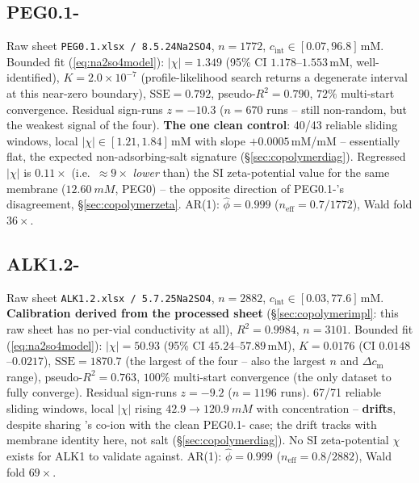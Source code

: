 \documentclass[11pt]{article}
\newcommand{\cint}{c_{\mathrm{int}}}
\newcommand{\SSE}{\mathrm{SSE}}
\begin{document}
\subsection{PEG0.1-}\label{sec:app-copolymer-peg01na2so4}
Raw sheet \texttt{PEG0.1.xlsx / 8.5.24Na2SO4}, $n=1772$,
$\cint\in[0.07,96.8]$\,mM. Bounded fit (\eqref{eq:na2so4model}):
$|\chi|=1.349$ (95\% CI $1.178$--$1.553$\,mM, well-identified), $K=2.0\times10^{-7}$
(profile-likelihood search returns a degenerate interval at this near-zero
boundary), $\SSE=0.792$, pseudo-$R^2=0.790$, $72\%$ multi-start convergence.
Residual sign-runs $z=-10.3$ ($n=670$ runs -- still non-random, but the
weakest signal of the four). \textbf{The one clean control}: 40/43 reliable
sliding windows, local $|\chi|\in[1.21,1.84]$\,mM with slope $+0.0005$\,mM/mM
-- essentially flat, the expected non-adsorbing-salt signature
(\S\ref{sec:copolymerdiag}). Regressed $|\chi|$ is $0.11\times$ (i.e.\
$\approx9\times$ \emph{lower} than) the SI zeta-potential value for the same
membrane ($\SI{12.60}{mM}$, PEG0) -- the opposite direction of
PEG0.1-'s disagreement, \S\ref{sec:copolymerzeta}. AR(1):
$\hat\phi=0.999$ ($n_{\mathrm{eff}}=0.7/1772$), Wald fold $36\times$.

\subsection{ALK1.2-}\label{sec:app-copolymer-alk12na2so4}
Raw sheet \texttt{ALK1.2.xlsx / 5.7.25Na2SO4}, $n=2882$,
$\cint\in[0.03,77.6]$\,mM. \textbf{Calibration derived from the processed
sheet} (\S\ref{sec:copolymerimpl}: this raw sheet has no per-vial
conductivity at all), $R^2=0.9984$, $n=3101$. Bounded fit
(\eqref{eq:na2so4model}): $|\chi|=50.93$ (95\% CI $45.24$--$57.89$\,mM),
$K=0.0176$ (CI $0.0148$--$0.0217$), $\SSE=1870.7$ (the largest of the four --
also the largest $n$ and $\Delta c_{\mathrm m}$ range), pseudo-$R^2=0.763$,
$100\%$ multi-start convergence (the only dataset to fully converge).
Residual sign-runs $z=-9.2$ ($n=1196$ runs). 67/71 reliable sliding windows,
local $|\chi|$ rising $42.9\to\SI{120.9}{mM}$ with concentration --
\textbf{drifts}, despite sharing 's co-ion with the clean
PEG0.1-\ce{Na2SO4} case; the drift tracks with membrane identity here, not
salt (\S\ref{sec:copolymerdiag}). No SI zeta-potential $\chi$ exists for
ALK1 to validate against. AR(1): $\hat\phi=0.999$ ($n_{\mathrm{eff}}=0.8/2882$),
Wald fold $69\times$.

\printbibliography
\end{document}
